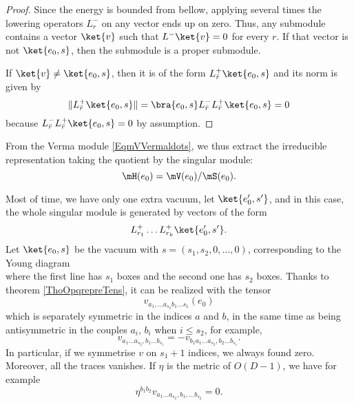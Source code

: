 \begin{proof}
Since the energy is bounded from bellow, applying several times the lowering operators $L^-_r$ on any vector ends up on zero. Thus, any submodule contains a vector $\ket{v}$ such that $L^-\ket{v}=0$ for every $r$. If that vector is not $\ket{e_0,s}$, then the submodule is a proper submodule.

If $\ket{v}\neq\ket{e_0,s}$, then it is of the form $L^+_{\bar r}\ket{e_0,s}$ and its norm is given by
\begin{equation}
	\| L^+_{\bar r}\ket{e_0,s} \|=\bra{e_0,s} L^-_{\bar r}L^+_{\bar r}\ket{e_0,s}=0
\end{equation}
because $L^-_{\bar r}L^+_{\bar r}\ket{e_0,s}=0$ by assumption.
\end{proof}
From the Verma module \eqref{EqmVVermaldots}, we thus extract the irreducible representation taking the quotient by the singular module:
\begin{equation}
	\mH(e_0) = \mV(e_0)/\mS(e_0).
\end{equation}

Most of time, we have only one extra vacuum, let $\ket{e'_0,s'}$, and in this case, the whole singular module is generated by vectors of the form
\begin{equation}
	L^+_{r_1}\ldots L^+_{r_k}\ket{e'_0,s'}.
\end{equation}
Let $\ket{e_0,s}$ be the vacuum with $s=(s_1,s_2,0,\ldots,0)$, corresponding to the Young diagram
\begin{equation}
   
%	
\end{equation}
where the first line has $s_1$ boxes and the second one has $s_2$ boxes. Thanks to theorem \ref{ThoOpqrepreTens}, it can be realized with the tensor
\begin{equation}
	v_{a_1,\ldots a_{s_2}b_1\ldots s_1}(e_0)
\end{equation}
which is separately symmetric in the indices $a$ and $b$, in the same time as being antisymmetric in the couples $a_i$, $b_i$ when $i\leq s_2$, for example,
\begin{equation}
	v_{a_1\ldots a_{s_2},b_1\ldots b_{s_1}} = -v_{b_1 a_1\ldots a_{s_2},b_2\ldots b_{s_1}}.
\end{equation}
In particular, if we symmetrise $v$ on $s_1+1$ indices, we always found zero. Moreover, all the traces vanishes. If $\eta$ is the metric of $O(D-1)$, we have for example
\begin{equation}
	\eta^{b_1b_2}v_{a_1\ldots a_{s_2},b_1,\ldots b_{s_2}}=0.
\end{equation}


